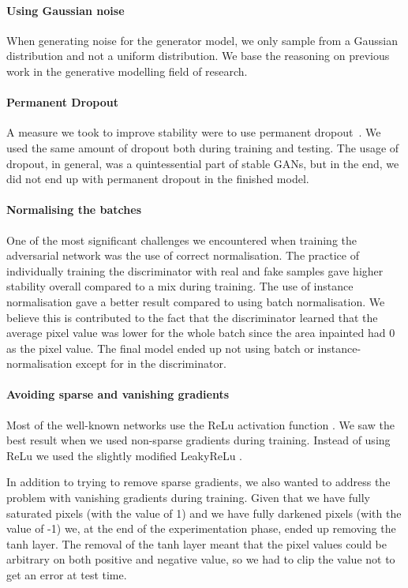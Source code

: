 \paragraph{Using Gaussian noise}
When generating noise for the generator model, we only sample from a Gaussian distribution and not a uniform distribution. We base the reasoning on previous work in the generative modelling field of research.

\paragraph{Permanent Dropout}
A measure we took to improve stability were to use permanent dropout~\cite{DBLP:journals/corr/IsolaZZE16}. We used the same amount of dropout both during training and testing.
The usage of dropout, in general, was a quintessential part of stable GANs, but in the end, we did not end up with permanent dropout in the finished model.


\paragraph{Normalising the batches}
One of the most significant challenges we encountered when training the adversarial network was the use of correct normalisation. 
The practice of individually training the discriminator with real and fake samples gave higher stability overall compared to a mix during training. 
The use of instance normalisation gave a better result compared to using batch normalisation. We believe this is contributed to the fact that the discriminator learned that the average pixel value was lower for the whole batch since the area inpainted had 0 as the pixel value.
The final model ended up not using batch or instance-normalisation except for in the discriminator. 



\paragraph{Avoiding sparse and vanishing gradients}
Most of the well-known networks use the ReLu\cite{Nair/2010/RLU/3104322.3104425} activation function \cite{DBLP:journals/corr/SimonyanZ14a} \cite{DBLP:journals/corr/SzegedyIV16} 
\cite{DBLP:journals/corr/HeZRS15}.
We saw the best result when we used non-sparse gradients during training. 
Instead of using ReLu we used the slightly modified LeakyReLu \cite{Maas2013RectifierNI}.

In addition to trying to remove sparse gradients, we also wanted to address the problem with vanishing gradients during training. Given that we have fully saturated pixels (with the value of 1) and we have fully darkened pixels (with the value of -1) we, at the end of the experimentation phase, ended up removing the tanh layer. 
The removal of the tanh layer meant that the pixel values could be arbitrary on both positive and negative value, so we had to clip the value not to get an error at test time. 



